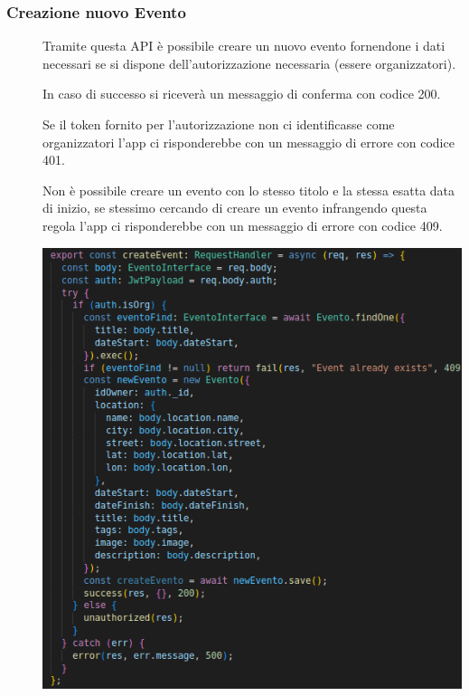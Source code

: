 \documentclass{article}
\begin{document}
\subsubsection{Creazione nuovo Evento}
\begin{description}
    \item[] Tramite questa API è possibile creare un nuovo evento fornendone i dati necessari se si dispone dell'autorizzazione necessaria (essere organizzatori).
    \item[] In caso di successo si riceverà un messaggio di conferma con codice 200.
    \item[] Se il token fornito per l'autorizzazione non ci identificasse come organizzatori l'app ci risponderebbe con un messaggio di errore con codice 401.
    \item[] Non è possibile creare un evento con lo stesso titolo e la stessa esatta data di inizio, se stessimo cercando di creare un evento infrangendo questa regola l'app ci risponderebbe con un messaggio di errore con codice 409.
    \item[] \begin{center}
            \includegraphics[scale=0.5]{newEvent.png}
        \end{center}
\end{description}
\clearpage
\end{document}
